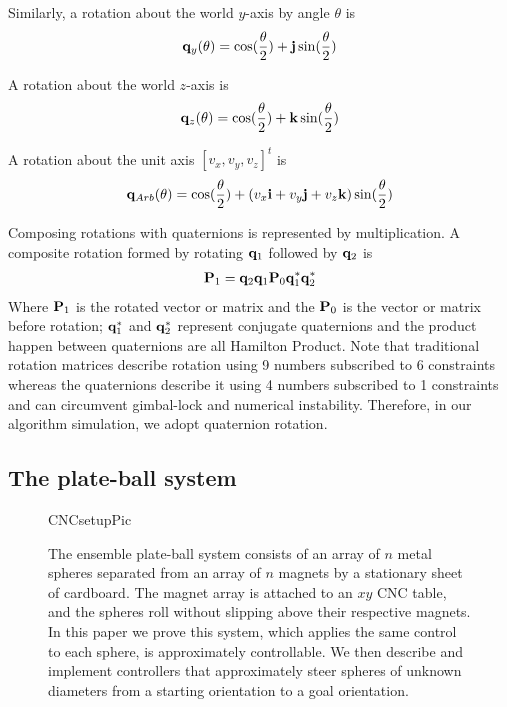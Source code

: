 \documentclass[letter paper, 10pt, conference]{ieeeconf}
\begin{document}
Similarly, a rotation about the world $y$-axis by angle $\theta$ is
\begin{align}
 {\bf q}_y(\theta) = \cos( \frac{\theta}{2})+{\bf j}\sin(\frac{\theta}{2}) \label{eq:QuaternionYaxis}
\end{align}

A rotation about the world $z$-axis is
\begin{align}
{\bf q}_z(\theta) = \cos( \frac{\theta}{2})+{\bf k}\sin(\frac{\theta}{2}) \label{eq:QuaternionZaxis}
\end{align}

A rotation about the unit axis $[v_x,v_y,v_z]^t$ is
\begin{align}
{\bf q}_{Arb}(\theta) = \cos( \frac{\theta}{2})+(v_x{\bf i}+v_y{\bf j}+v_z{\bf k})\sin(\frac{\theta}{2}) \label{eq:QuaternionUnitaxis}
\end{align}

Composing rotations with quaternions is represented by multiplication.  A composite rotation formed by rotating ${\bf q}_1$ followed by  ${\bf q}_2$  is 
\begin{align}
{\bf P}_1={\bf q}_2{\bf q}_1{\bf P}_0{\bf q}_1^*{\bf q}_2^*
\end{align}
Where ${\bf P}_1$ is the rotated vector or matrix and the ${\bf P}_0$ is the vector or matrix before rotation; ${\bf q}_1^*$ and ${\bf q}_2^*$ represent conjugate quaternions and the product happen between quaternions are all Hamilton Product. 
Note that traditional rotation matrices describe rotation using 9 numbers subscribed to 6 constraints whereas the quaternions describe it using 4 numbers subscribed to 1 constraints and can circumvent gimbal-lock and numerical instability. Therefore, in our algorithm simulation, we adopt quaternion rotation.




\subsection{The plate-ball system}

    \begin{figure}%
	\begin{center}
	\begin{overpic}[width=.9\columnwidth]{CNCsetupPic}
	\end{overpic}
	\end{center}
	\vspace{-1em}
	\caption{ \label{fig:CNCtable} The ensemble plate-ball system consists of an array of $n$ metal spheres separated from an array of $n$ magnets by a stationary sheet of cardboard.  The magnet array is attached to an $xy$ CNC table, and the spheres roll without slipping above their respective magnets.  
In this paper we prove this system, which applies the same control to each sphere, is approximately controllable.  We then describe and implement controllers that approximately steer spheres of unknown diameters from a starting orientation to a goal orientation.	
}\vspace{-1em}
\end{figure}
\end{document}
